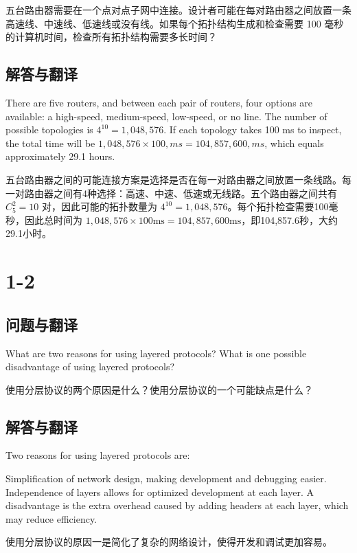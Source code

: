五台路由器需要在一个点对点子网中连接。设计者可能在每对路由器之间放置一条高速线、中速线、低速线或没有线。如果每个拓扑结构生成和检查需要 100 毫秒的计算机时间，检查所有拓扑结构需要多长时间？

\subsection{解答与翻译}

There are five routers, and between each pair of routers, four options are available: a high-speed, medium-speed, low-speed, or no line. The number of possible topologies is $4^{10} = 1,048,576$. If each topology takes 100 ms to inspect, the total time will be $1,048,576 \times 100 , ms = 104,857,600 , ms$, which equals approximately 29.1 hours.

五台路由器之间的可能连接方案是选择是否在每一对路由器之间放置一条线路。每一对路由器之间有4种选择：高速、中速、低速或无线路。五个路由器之间共有 $C_{5}^{2} = 10$ 对，因此可能的拓扑数量为 $4^{10} = 1,048,576$。每个拓扑检查需要100毫秒，因此总时间为 $1,048,576 \times 100 \text{ms} = 104,857,600 \text{ms}$，即104,857.6秒，大约29.1小时。

\section{1-2}

\subsection{问题与翻译}

What are two reasons for using layered protocols? What is one possible disadvantage of using layered protocols?

使用分层协议的两个原因是什么？使用分层协议的一个可能缺点是什么？

\subsection{解答与翻译}

Two reasons for using layered protocols are:

Simplification of network design, making development and debugging easier.\\
Independence of layers allows for optimized development at each layer. A disadvantage is the extra overhead caused by adding headers at each layer, which may reduce efficiency.

使用分层协议的原因一是简化了复杂的网络设计，使得开发和调试更加容易。

